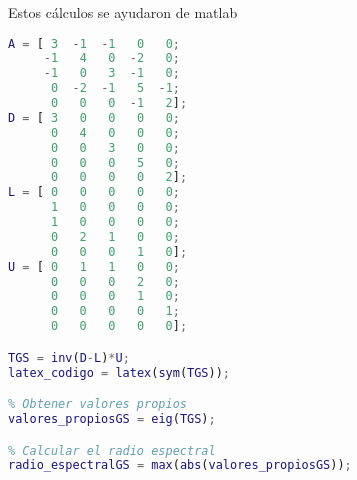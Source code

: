 \begin{homeworkProblem}
\begin{enumerate}
\begin{solucion}
\begin{enumerate}
            Estos cálculos se ayudaron de matlab
            \newpage
            \begin{lstlisting}[language = matlab]
% Definir la matriz
A = [ 3  -1  -1   0   0;
     -1   4   0  -2   0;
     -1   0   3  -1   0;
      0  -2  -1   5  -1;
      0   0   0  -1   2];
D = [ 3   0   0   0   0;
      0   4   0   0   0;
      0   0   3   0   0;
      0   0   0   5   0;
      0   0   0   0   2];
L = [ 0   0   0   0   0;
      1   0   0   0   0;
      1   0   0   0   0;
      0   2   1   0   0;
      0   0   0   1   0];
U = [ 0   1   1   0   0;
      0   0   0   2   0;
      0   0   0   1   0;
      0   0   0   0   1;
      0   0   0   0   0];

TGS = inv(D-L)*U;
latex_codigo = latex(sym(TGS));

% Obtener valores propios
valores_propiosGS = eig(TGS);

% Calcular el radio espectral
radio_espectralGS = max(abs(valores_propiosGS));


\end{lstlisting}
\end{enumerate}
\end{solucion}
\end{enumerate}
\end{homeworkProblem}
